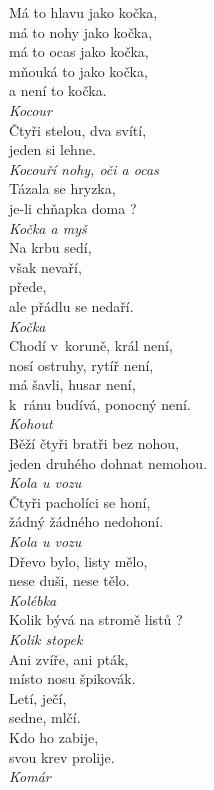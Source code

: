\begin{multicols}{\value{columnsthindata}}
\noindent
Má to hlavu jako kočka,\\
má to nohy jako kočka,\\
má to ocas jako kočka,\\
mňouká to jako kočka,\\
a není to kočka.\\[1 mm]
{\sl Kocour}\\

\noindent
Čtyři stelou, dva svítí,\\
jeden si lehne.\\[1 mm]
{\sl Kocouří nohy, oči a ocas}\\

\noindent
Tázala se hryzka,\\
je-li chňapka doma ?\\[1 mm]
{\sl Kočka a myš}\\

\noindent
Na krbu sedí,\\
však nevaří,\\
přede,\\
ale přádlu se nedaří.\\[1 mm]
{\sl Kočka}\\

\noindent
Chodí v~koruně, král není,\\
nosí ostruhy, rytíř není,\\
má šavli, husar není,\\
k~ránu budívá, ponocný není.\\[1 mm]
{\sl Kohout}\\

\noindent
Běží čtyři bratři bez nohou,\\
jeden druhého dohnat nemohou.\\[1 mm]
{\sl Kola u vozu}\\

\noindent
Čtyři pacholíci se honí,\\
žádný žádného nedohoní.\\[1 mm]
{\sl Kola u vozu}\\

\noindent
Dřevo bylo, listy mělo,\\
nese duši, nese tělo.\\[1 mm]
{\sl Kolébka}\\

\noindent
Kolik bývá na stromě listů ?\\[1 mm]
{\sl Kolik stopek}\\

\noindent
Ani zvíře, ani pták,\\
místo nosu špikovák.\\
Letí, ječí,\\
sedne, mlčí.\\
Kdo ho zabije,\\
svou krev prolije.\\[1 mm]
{\sl Komár}\\


\end{multicols}
